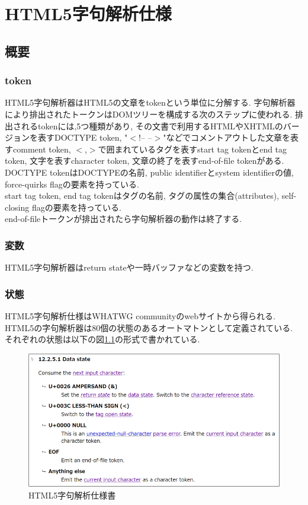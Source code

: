 \documentclass[uplatex,a4j]{jsreport}
\begin{document}
\chapter{HTML5字句解析仕様}
\label{字句解析仕様}
\section{概要}
\subsection*{token}
HTML5字句解析器はHTML5の文章をtokenという単位に分解する.
字句解析器により排出されたトークンはDOMツリーを構成する次のステップに使われる.
排出されるtokenには,5つ種類があり,
その文書で利用するHTMLやXHTMLのバージョンを表すDOCTYPE token, "$<$!-- --$>$"などでコメントアウトした文章を表すcomment token, $<$,$>$で囲まれているタグを表すstart tag tokenとend tag token, 
文字を表すcharacter token, 文章の終了を表すend-of-file tokenがある.\\

DOCTYPE tokenはDOCTYPEの名前,  public identifierとsystem identifierの値, force-quirks flagの要素を持っている.\\
start tag token, end tag tokenはタグの名前, タグの属性の集合(attributes), self-closing flagの要素を持っている.\\
end-of-fileトークンが排出されたら字句解析器の動作は終了する.\\
\subsection*{変数}
HTML5字句解析器はreturn stateや一時バッファなどの変数を持つ.
\subsection*{状態}
HTML5字句解析仕様はWHATWG communityのwebサイトから得られる.~\cite{html5specification}\\
HTML5の字句解析器は80個の状態のあるオートマトンとして定義されている.
それぞれの状態は以下の図\ref{html5}の形式で書かれている.\\
\begin{figure}[h]
    \centering
    \includegraphics[keepaspectratio, scale=1.0]
         {figure/html5.png}
    \caption{HTML5字句解析仕様書}
    \label{html5}
\end{figure}
\end{document}
